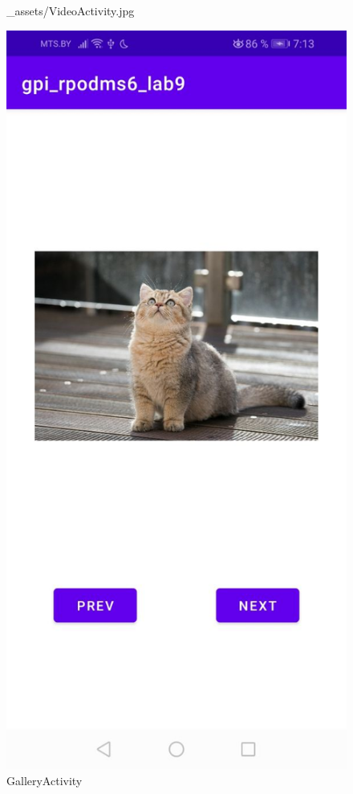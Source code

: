 \documentclass[12pt, a4paper, simple]{eskdtext}
\begin{document}
\begin{figure}[!h]
\begin{minipage}{0.19\textwidth}
                {_assets/VideoActivity.jpg}
            \caption{VideoActivity}
        \end{minipage}
        \begin{minipage}{0.19\textwidth}
            \centering
            \includegraphics[width=\linewidth]
                {_assets/GalleryActivity.jpg}
            \caption{GalleryActivity}
        \end{minipage}
    \end{figure}
\end{document}
